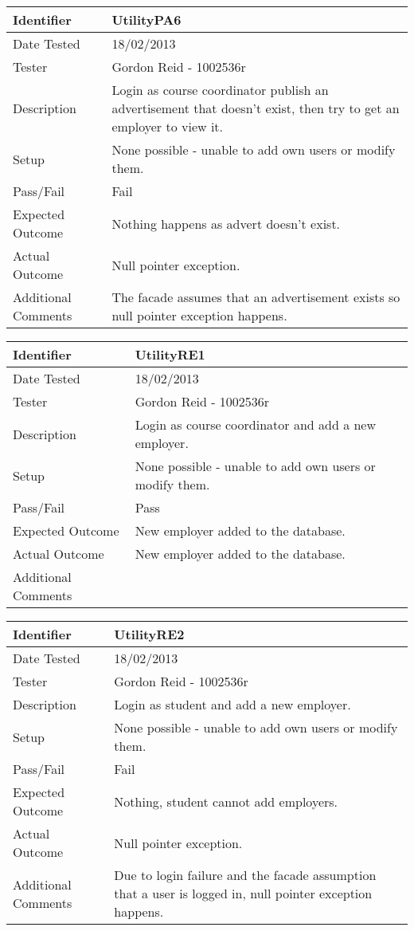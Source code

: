 \begin{tabularx}{\textwidth}{|T|L|}
\hline
Identifier & UtilityPA6\\
\hline
Date Tested & 18/02/2013\\
\hline
Tester & Gordon Reid - 1002536r\\
\hline
Description & Login as course coordinator publish an advertisement that
doesn't exist, then try to get an employer to view it.\\
\hline
Setup & None possible - unable to add own users or modify them.\\
\hline
Pass/Fail & Fail\\
\hline
Expected Outcome & Nothing happens as advert doesn't exist.\\
\hline
Actual Outcome & Null pointer exception.\\
\hline
Additional Comments & The facade assumes that an advertisement exists so
null pointer exception happens.\\
\hline
\end{tabularx}

\begin{tabularx}{\textwidth}{|T|L|}
\hline
Identifier & UtilityRE1\\
\hline
Date Tested & 18/02/2013\\
\hline
Tester & Gordon Reid - 1002536r\\
\hline
Description & Login as course coordinator and add a new employer.\\
\hline
Setup & None possible - unable to add own users or modify them.\\
\hline
Pass/Fail & Pass\\
\hline
Expected Outcome & New employer added to the database.\\
\hline
Actual Outcome & New employer added to the database.\\
\hline
Additional Comments &\\
\hline
\end{tabularx}

\vspace{2em}

\begin{tabularx}{\textwidth}{|T|L|}
\hline
Identifier & UtilityRE2\\
\hline
Date Tested & 18/02/2013\\
\hline
Tester & Gordon Reid - 1002536r\\
\hline
Description & Login as student and add a new employer.\\
\hline
Setup & None possible - unable to add own users or modify them.\\
\hline
Pass/Fail & Fail\\
\hline
Expected Outcome & Nothing, student cannot add employers.\\
\hline
Actual Outcome & Null pointer exception.\\
\hline
Additional Comments & Due to login failure and the facade assumption that a user 
is logged in, null pointer exception happens.\\
\hline
\end{tabularx}

